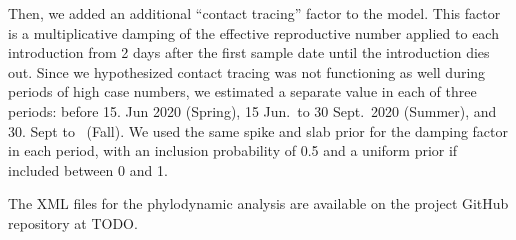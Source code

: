\documentclass[11pt,twoside,lineno]{pnas-new} %
\begin{document}
Then, we added an additional ``contact tracing'' factor to the model. This factor is a multiplicative damping of the effective reproductive number applied to each introduction from 2 days after the first sample date until the introduction dies out. Since we hypothesized contact tracing was not functioning as well during periods of high case numbers, we estimated a separate value in each of three periods: before 15. Jun 2020 (Spring), 15 Jun.~to 30 Sept.~2020 (Summer), and 30. Sept to \maxdate\ (Fall). We used the same spike and slab prior for the damping factor in each period, with an inclusion probability of 0.5 and a uniform prior if included between 0 and 1. 

The XML files for the phylodynamic analysis are available on the project GitHub repository at TODO.


\showacknow{} %

\printbibliography
\end{document}
